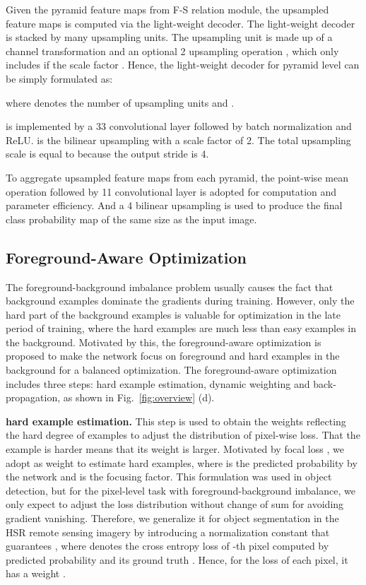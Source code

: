 \documentclass[10pt,twocolumn,letterpaper]{article}
\begin{document}
Given the pyramid feature maps   from F-S relation module, the upsampled feature maps  is computed via the light-weight decoder.
The light-weight decoder is stacked by many upsampling units.
The upsampling unit is made up of a channel transformation  and an optional 2 upsampling operation , which only includes  if the scale factor .
Hence, the light-weight decoder for pyramid level  can be simply formulated as:

where  denotes the number of upsampling units and .

 is implemented by a 33 convolutional layer followed by batch normalization and ReLU.
 is the bilinear upsampling with a scale factor of 2.
The total upsampling scale  is equal to  because the output stride is 4.

To aggregate upsampled feature maps from each pyramid, the point-wise mean operation followed by 11 convolutional layer is adopted for computation and parameter efficiency.
And a 4 bilinear upsampling is used to produce the final class probability map of the same size as the input image.



\subsection{Foreground-Aware Optimization}
The foreground-background imbalance problem usually causes the fact that background examples dominate the gradients during training.
However, only the hard part of the background examples is valuable for optimization in the late period of training, where the hard examples are much less than easy examples in the background.
Motivated by this, the foreground-aware optimization is proposed to make the network focus on foreground and hard examples in the background for a balanced optimization.
The foreground-aware optimization includes three steps: hard example estimation, dynamic weighting and back-propagation, as shown in Fig.~\ref{fig:overview} (d).


\textbf{hard example estimation.}
This step is used to obtain the weights reflecting the hard degree of examples to adjust the distribution of pixel-wise loss.
That the example is harder means that its weight is larger.
Motivated by focal loss \cite{lin2017focal}, we adopt  as weight to estimate hard examples, where  is the predicted probability by the network and  is the focusing factor.
This formulation was used in object detection, but for the pixel-level task with foreground-background imbalance, we only expect to adjust the loss distribution without change of sum for avoiding gradient vanishing.
Therefore, we generalize it for object segmentation in the HSR remote sensing imagery by introducing a normalization constant  that guarantees , where  denotes the cross entropy loss of -th pixel computed by predicted probability  and its ground truth .
Hence, for the loss of each pixel, it has a weight .
\end{document}
